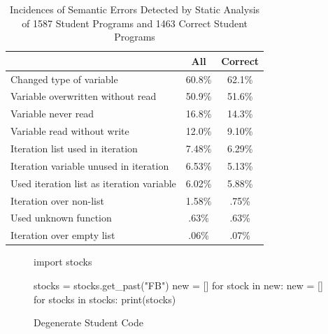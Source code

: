 \documentclass[10pt,journal,compsoc]{IEEEtran}
\begin{document}
\begin{table}[!t]
\renewcommand{\arraystretch}{1.3}
\caption{Incidences of Semantic Errors Detected by Static Analysis of 1587 Student Programs and 1463 Correct Student Programs}
\label{table:static-analysis-errors}
\centering
\begin{tabular}{l|c|c}
\hline
 & All & Correct \\\hline
Changed type of variable & 60.8\% & 62.1\% \\\hline
Variable overwritten without read & 50.9\% & 51.6\%\\\hline
Variable never read & 16.8\% & 14.3\% \\\hline
  Variable read without write & 12.0\% & 9.10\% \\\hline
Iteration list used in iteration & 7.48\% & 6.29\% \\\hline
Iteration variable unused in iteration & 6.53\% & 5.13\% \\\hline
Used iteration list as iteration variable & 6.02\% & 5.88\%\\\hline
Iteration over non-list & 1.58\% & .75\%\\\hline
Used unknown function & .63\% & .63\% \\\hline
Iteration over empty list & .06\% & .07\% \\\hline
\end{tabular}
\end{table}

\begin{figure}
\begin{python}
import stocks

stocks = stocks.get_past("FB")
new = []
for stock in new:
    new = []
for stocks in stocks:
    print(stocks)
\end{python}
\vspace{-\medskipamount}
\caption{Degenerate Student Code}
\label{fig-degenerate-code}
\vspace{-\bigskipamount}
\end{figure}
\end{document}
